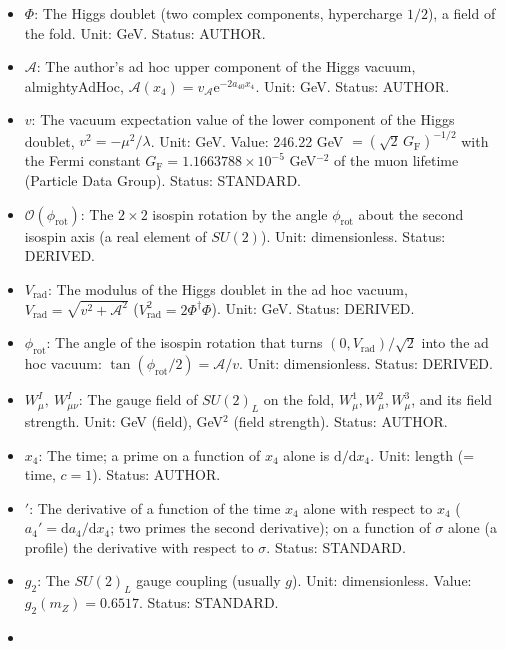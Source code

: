 \documentclass[
  10pt,
]{article}
\providecommand{\tightlist}{%
  \setlength{\itemsep}{0pt}\setlength{\parskip}{0pt}}
\begin{document}
\begin{itemize}
\tightlist
\item
  \(\Phi\): The Higgs doublet (two complex components, hypercharge
  \(1/2\)), a field of the fold. Unit: GeV. Status: AUTHOR.
\item
  \(\mathcal{A}\): The author's ad hoc upper component of the Higgs
  vacuum, almightyAdHoc,
  \(\mathcal{A}(x_4) = v_{\mathcal{A}}\mathrm{e}^{-2a_{40}x_4}\). Unit:
  GeV. Status: AUTHOR.
\item
  \(v\): The vacuum expectation value of the lower component of the
  Higgs doublet, \(v^2 = -\mu^2/\lambda\). Unit: GeV. Value: 246.22 GeV
  \(= (\sqrt2\,G_{\mathrm{F}})^{-1/2}\) with the Fermi constant
  \(G_{\mathrm{F}} = 1.1663788\times10^{-5}\) GeV\(^{-2}\) of the muon
  lifetime (Particle Data Group). Status: STANDARD.
\item
  \(\mathcal{O}(\phi_{\mathrm{rot}})\): The \(2 \times 2\) isospin
  rotation by the angle \(\phi_{\mathrm{rot}}\) about the second isospin
  axis (a real element of \(SU(2)\)). Unit: dimensionless. Status:
  DERIVED.
\item
  \(V_{\mathrm{rad}}\): The modulus of the Higgs doublet in the ad hoc
  vacuum, \(V_{\mathrm{rad}} = \sqrt{v^2 + \mathcal{A}^2}\)
  (\(V_{\mathrm{rad}}^2 = 2\Phi^\dagger\Phi\)). Unit: GeV. Status:
  DERIVED.
\item
  \(\phi_{\mathrm{rot}}\): The angle of the isospin rotation that turns
  \((0, V_{\mathrm{rad}})/\sqrt2\) into the ad hoc vacuum:
  \(\tan(\phi_{\mathrm{rot}}/2) = \mathcal{A}/v\). Unit: dimensionless.
  Status: DERIVED.
\item
  \(W^I_\mu,\ W^I_{\mu\nu}\): The gauge field of \(SU(2)_L\) on the
  fold, \(W^1_\mu, W^2_\mu, W^3_\mu\), and its field strength. Unit: GeV
  (field), GeV\(^2\) (field strength). Status: AUTHOR.
\item
  \(x_4\): The time; a prime on a function of \(x_4\) alone is
  \(\mathrm{d}/\mathrm{d}x_4\). Unit: length (= time, \(c = 1\)).
  Status: AUTHOR.
\item
  \({}'\): The derivative of a function of the time \(x_4\) alone with
  respect to \(x_4\) (\(a_4' = \mathrm{d}a_4/\mathrm{d}x_4\); two primes
  the second derivative); on a function of \(\sigma\) alone (a profile)
  the derivative with respect to \(\sigma\). Status: STANDARD.
\item
  \(g_2\): The \(SU(2)_L\) gauge coupling (usually \(g\)). Unit:
  dimensionless. Value: \(g_2(m_Z) = 0.6517\). Status: STANDARD.
\item

\end{itemize}
\end{document}
